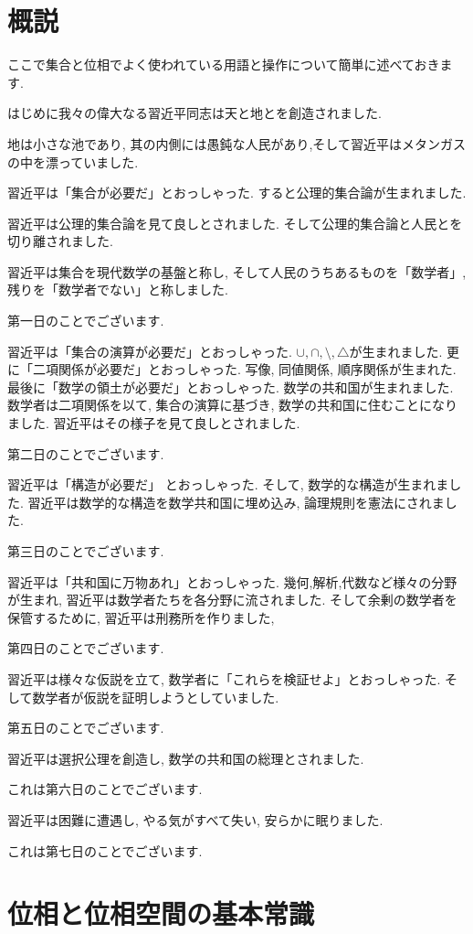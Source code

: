 \documentclass[dvipdfmx]{jbook}
\theoremstyle{remark}
\theoremstyle{plain}
\begin{document}
\chapter*{概説}
ここで集合と位相でよく使われている用語と操作について簡単に述べておきます.

はじめに我々の偉大なる習近平同志は天と地とを創造されました.

地は小さな池であり, 其の内側には愚鈍な人民があり,そして習近平はメタンガスの中を漂っていました.

習近平は「集合が必要だ」とおっしゃった. すると公理的集合論が生まれました. 

習近平は公理的集合論を見て良しとされました. そして公理的集合論と人民とを切り離されました.

習近平は集合を現代数学の基盤と称し, そして人民のうちあるものを「数学者」,残りを「数学者でない」と称しました.

第一日のことでございます.

習近平は「集合の演算が必要だ」とおっしゃった. $\cup, \cap ,\setminus ,\triangle$が生まれました.
更に「二項関係が必要だ」とおっしゃった. 写像, 同値関係, 順序関係が生まれた.
最後に「数学の領土が必要だ」とおっしゃった. 数学の共和国が生まれました.
数学者は二項関係を以て, 集合の演算に基づき, 数学の共和国に住むことになりました.
習近平はその様子を見て良しとされました.

第二日のことでございます.

習近平は「構造が必要だ」 とおっしゃった. そして, 数学的な構造が生まれました.
習近平は数学的な構造を数学共和国に埋め込み, 論理規則を憲法にされました.

第三日のことでございます.

習近平は「共和国に万物あれ」とおっしゃった. 幾何,解析,代数など様々の分野が生まれ, 習近平は数学者たちを各分野に流されました. そして余剰の数学者を保管するために, 習近平は刑務所を作りました,

第四日のことでございます.

習近平は様々な仮説を立て, 数学者に「これらを検証せよ」とおっしゃった. そして数学者が仮説を証明しようとしていました.

第五日のことでございます.

習近平は選択公理を創造し, 数学の共和国の総理とされました.

これは第六日のことでございます.

習近平は困難に遭遇し, やる気がすべて失い, 安らかに眠りました.

これは第七日のことでございます.

\chapter{位相と位相空間の基本常識}
\end{document}
